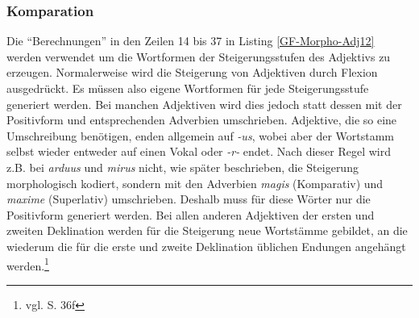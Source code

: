 \subsubsection{Komparation}
Die "`Berechnungen"' in den Zeilen 14 bis 37 in Listing \ref{GF-Morpho-Adj12} werden verwendet um die Wortformen der Steigerungsstufen des Adjektivs zu erzeugen. Normalerweise wird die Steigerung von Adjektiven durch Flexion ausgedrückt. Es müssen also eigene Wortformen für jede Steigerungsstufe generiert werden. Bei manchen Adjektiven wird dies jedoch statt dessen mit der Positivform und entsprechenden Adverbien umschrieben. Adjektive, die so eine Umschreibung benötigen, enden allgemein auf \textit{-us}, wobei aber der Wortstamm selbst wieder entweder auf einen Vokal oder \textit{-r-} endet. Nach dieser Regel wird z.B. bei \textit{arduus} und \textit{mirus} nicht, wie später beschrieben, die Steigerung morphologisch kodiert, sondern mit den Adverbien \textit{magis} (Komparativ) und \textit{maxime} (Superlativ) umschrieben. Deshalb muss für diese Wörter nur die Positivform generiert werden. Bei allen anderen Adjektiven der ersten und zweiten Deklination werden für die Steigerung neue Wortstämme gebildet, an die wiederum die für die erste und zweite Deklination üblichen Endungen angehängt werden.\footnote{vgl. \cite{BAYER-LINDAUER1994} S. 36f} \par

